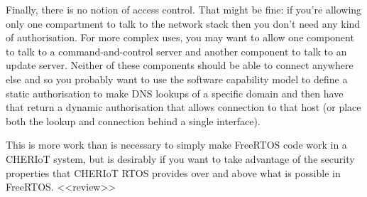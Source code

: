 Finally, there is no notion of access control.
That might be fine: if you're allowing only one compartment to talk to the network stack then you don't need any kind of authorisation.
For more complex uses, you may want to allow one component to talk to a command-and-control server and another component to talk to an update server.
Neither of these components should be able to connect anywhere else and so you probably want to use the software capability model to define a static authorisation to make DNS lookups of a specific domain and then have that return a dynamic authorisation that allows connection to that host (or place both the lookup and connection behind a single interface).

This is more work than is necessary to simply make FreeRTOS code work in a CHERIoT system, but is desirably if you want to take advantage of the security properties that CHERIoT RTOS provides over and above what is possible in FreeRTOS.
<<review>>
